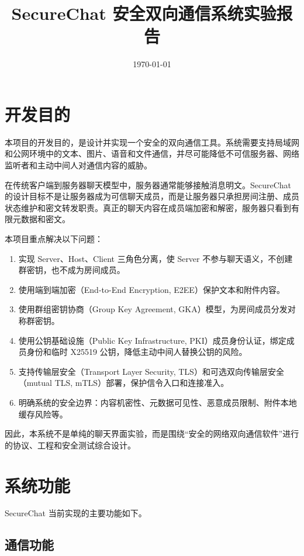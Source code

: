 \documentclass[UTF8,a4paper,12pt]{ctexart}
\title{SecureChat 安全双向通信系统实验报告}
\author{}
\date{\today}
\begin{document}
\maketitle
\tableofcontents
\newpage

\section{开发目的}

本项目的开发目的，是设计并实现一个安全的双向通信工具。系统需要支持局域网和公网环境中的文本、图片、语音和文件通信，并尽可能降低不可信服务器、网络监听者和主动中间人对通信内容的威胁。

在传统客户端到服务器聊天模型中，服务器通常能够接触消息明文。SecureChat 的设计目标不是让服务器成为可信聊天成员，而是让服务器只承担房间注册、成员状态维护和密文转发职责。真正的聊天内容在成员端加密和解密，服务器只看到有限元数据和密文。

本项目重点解决以下问题：

\begin{enumerate}
  \item 实现 Server、Host、Client 三角色分离，使 Server 不参与聊天语义，不创建群密钥，也不成为房间成员。
  \item 使用端到端加密（End-to-End Encryption, E2EE）保护文本和附件内容。
  \item 使用群组密钥协商（Group Key Agreement, GKA）模型，为房间成员分发对称群密钥。
  \item 使用公钥基础设施（Public Key Infrastructure, PKI）成员身份认证，绑定成员身份和临时 X25519 公钥，降低主动中间人替换公钥的风险。
  \item 支持传输层安全（Transport Layer Security, TLS）和可选双向传输层安全（mutual TLS, mTLS）部署，保护信令入口和连接准入。
  \item 明确系统的安全边界：内容机密性、元数据可见性、恶意成员限制、附件本地缓存风险等。
\end{enumerate}

因此，本系统不是单纯的聊天界面实验，而是围绕“安全的网络双向通信软件”进行的协议、工程和安全测试综合设计。

\section{系统功能}

SecureChat 当前实现的主要功能如下。

\subsection{通信功能}
\end{document}
